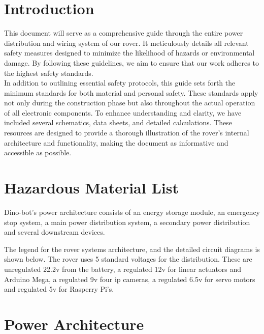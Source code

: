 \section{Introduction}

This document will serve as a comprehensive guide through the entire power distribution and wiring system of our rover. It meticulously details all relevant safety measures designed to minimize the likelihood of hazards or environmental damage. By following these guidelines, we aim to ensure that our work adheres to the highest safety standards.\\

In addition to outlining essential safety protocols, this guide sets forth the minimum standards for both material and personal safety. These standards apply not only during the construction phase but also throughout the actual operation of all electronic components. To enhance understanding and clarity, we have included several schematics, data sheets, and detailed calculations. These resources are designed to provide a thorough illustration of the rover's internal architecture and functionality, making the document as informative and accessible as possible.

\section{Hazardous Material List}

Dino-bot's power architecture consists of an energy storage module, an emergency stop system, a main
power distribution system, a secondary power distribution and several
downstream devices.


The legend for the rover systems architecture, and the detailed circuit diagrams is
shown below.
The rover uses 5 standard voltages for the distribution. These are unregulated 22.2v
from the battery, a regulated 12v for linear actuators and Arduino Mega, a regulated 9v
four ip cameras, a regulated 6.5v for servo motors and regulated 5v for Rasperry Pi’s.

\newpage



\newpage
\section{Power Architecture}

